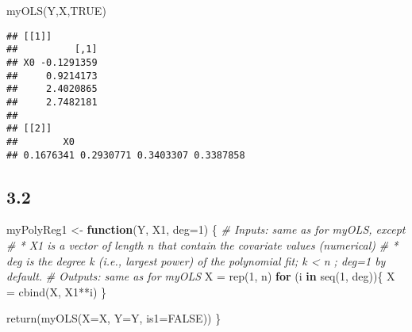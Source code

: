 \documentclass[
  11pt,
]{article}
\newenvironment{Shaded}{\begin{snugshade}}{\end{snugshade}}
\newcommand{\AttributeTok}[1]{\textcolor[rgb]{0.77,0.63,0.00}{#1}}
\newcommand{\CommentTok}[1]{\textcolor[rgb]{0.56,0.35,0.01}{\textit{#1}}}
\newcommand{\ConstantTok}[1]{\textcolor[rgb]{0.00,0.00,0.00}{#1}}
\newcommand{\ControlFlowTok}[1]{\textcolor[rgb]{0.13,0.29,0.53}{\textbf{#1}}}
\newcommand{\DecValTok}[1]{\textcolor[rgb]{0.00,0.00,0.81}{#1}}
\newcommand{\FunctionTok}[1]{\textcolor[rgb]{0.00,0.00,0.00}{#1}}
\newcommand{\NormalTok}[1]{#1}
\newcommand{\OtherTok}[1]{\textcolor[rgb]{0.56,0.35,0.01}{#1}}
\newcommand{\SpecialCharTok}[1]{\textcolor[rgb]{0.00,0.00,0.00}{#1}}
\begin{document}
\begin{Shaded}
\begin{Highlighting}[]
\FunctionTok{myOLS}\NormalTok{(Y,X,}\ConstantTok{TRUE}\NormalTok{)}
\end{Highlighting}
\end{Shaded}

\begin{verbatim}
## [[1]]
##          [,1]
## X0 -0.1291359
##     0.9214173
##     2.4020865
##     2.7482181
## 
## [[2]]
##        X0                               
## 0.1676341 0.2930771 0.3403307 0.3387858
\end{verbatim}

\hypertarget{section-1}{%
\subsection{3.2}\label{section-1}}

\begin{Shaded}
\begin{Highlighting}[]
\NormalTok{myPolyReg1 }\OtherTok{\textless{}{-}} \ControlFlowTok{function}\NormalTok{(Y, X1, }\AttributeTok{deg=}\DecValTok{1}\NormalTok{) \{}
\CommentTok{\# Inputs: same as for myOLS, except}
\CommentTok{\# * X1 is a vector of length n that contain the covariate values (numerical)}
\CommentTok{\# * deg is the degree k (i.e., largest power) of the polynomial fit; k \textless{} n ; deg=1 by default.}
\CommentTok{\# Outputs: same as for myOLS}
\NormalTok{  X }\OtherTok{=} \FunctionTok{rep}\NormalTok{(}\DecValTok{1}\NormalTok{, n)}
  \ControlFlowTok{for}\NormalTok{ (i }\ControlFlowTok{in} \FunctionTok{seq}\NormalTok{(}\DecValTok{1}\NormalTok{, deg))\{}
\NormalTok{    X }\OtherTok{=} \FunctionTok{cbind}\NormalTok{(X, X1}\SpecialCharTok{**}\NormalTok{i)}
\NormalTok{  \}}
  
  \FunctionTok{return}\NormalTok{(}\FunctionTok{myOLS}\NormalTok{(}\AttributeTok{X=}\NormalTok{X, }\AttributeTok{Y=}\NormalTok{Y, }\AttributeTok{is1=}\ConstantTok{FALSE}\NormalTok{))}
\NormalTok{\}}
\end{Highlighting}
\end{Shaded}
\end{document}

